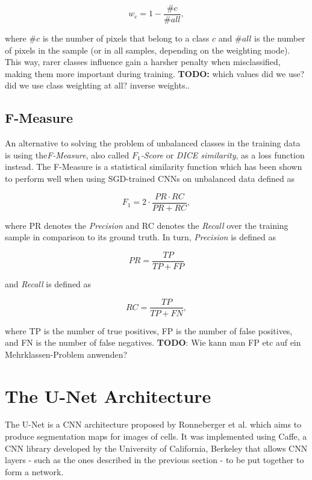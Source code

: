 \[ w_c = 1 - \frac{\#c}{\#all}, \]

\noindent where $\#c$ is the number of pixels that belong to a class $c$ and $\#all$ is the number of pixels in the sample (or in all samples, depending on the weighting mode). This way, rarer classes influence gain a harsher penalty when misclassified, making them more important during training.  \textbf{TODO:} which values did we use? did we use class weighting at all? inverse weights..


		\subsection{F-Measure}

An alternative to solving the problem of unbalanced classes in the training data is using the\textit{F-Measure}, also called $F_1$\textit{-Score} or \textit{DICE similarity}, as a loss function instead. The F-Measure is a statistical similarity function which has been shown to perform well when using SGD-trained CNNs on unbalanced data\cite{fmeasure3}\cite{fmeasure4}\cite{fmeasure5} defined as

\[F_1 = 2 \cdot \frac{PR \cdot RC}{PR + RC},\]

\noindent where PR denotes the \textit{Precision} and RC denotes the \textit{Recall} over the training sample in comparison to its ground truth. In turn, \textit{Precision} is defined as

\[PR = \frac{TP}{TP + FP}\]

\noindent and \textit{Recall} is defined as

\[RC = \frac{TP}{TP + FN},\]

\noindent where TP is the number of true positives, FP is the number of false positives, and FN is the number of false negatives. \textbf{TODO}: Wie kann man FP etc auf ein Mehrklassen-Problem anwenden?

	\section {The U-Net Architecture}
The U-Net is a CNN architecture proposed by Ronneberger et al.\cite{unet} which aims to produce segmentation maps for images of cells. It was implemented using Caffe\cite{caffe}, a CNN library developed by the University of California, Berkeley that allows CNN layers - such as the ones described in the previous section - to be put together to form a network.

